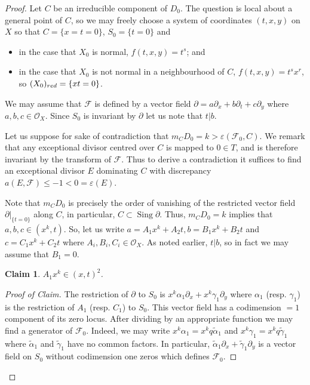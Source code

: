 \documentclass[10pt,a4paper]{amsart}
\newtheorem{claim}[theorem]{Claim}
\DeclareMathOperator{\sing}{Sing}
\begin{document}
\begin{proof}
	Let $C$ be an irreducible component of $D_0$.  The question is local about a general point of  $C$, so we may freely choose a system of coordinates $(t, x, y)$ on $X$ so that
	 $C = \{x = t = 0\}$, $S_0 = \{t = 0\}$ and 
     \begin{itemize}
         \item in the case that $X_0$ is normal, $f(t, x, y) = t^s$; and 
         \item  in the case that $X_0$ is not normal in a neighbourhood of $C$, $f(t, x, y) = t^sx^r$, so $(X_0)_{{\rm red}} = \{xt = 0\}$.
     \end{itemize}
 
	We may assume that $\mathcal F$ is defined by a vector field  $\partial = a\partial_x+b\partial_t+c\partial_y$
    where $a, b, c \in \mathcal O_X$.  Since $S_0$ is invariant by $\partial$ let us note that $t|b$.



Let us suppose for sake of contradiction that $m_CD_0 = k >\varepsilon(\mathcal F_0, C)$.
We remark that any exceptional divisor centred over $C$ is mapped to $0 \in T$, and is therefore invariant by the transform of $\mathcal F$.  Thus to derive a contradiction it suffices to find an exceptional divisor $E$ dominating $C$ with discrepancy $a(E, \mathcal F) \leq -1 < 0 = \varepsilon(E)$.




Note that $m_CD_0$ is precisely the order of vanishing of the restricted vector field $\partial|_{\{t = 0\}}$ along $C$, in particular, $C \subset \sing \partial$.  Thus,
$m_CD_0 = k$
implies that $a, b, c \in (x^k, t)$.
So, let us write $a = A_1x^k+A_2t, b = B_1x^k+B_2t$
and $c = C_1x^k+C_2t$ where $A_i, B_i, C_i \in \mathcal O_X$.
As noted earlier, $t|b$, so in fact we may assume that $B_1 = 0$.


\begin{claim}
\label{claim_order2}
$A_1x^k \in (x, t)^2$.
\end{claim}
\begin{proof}[Proof of Claim]
The restriction of $\partial$ to $S_0$ is 
$x^k\alpha_1\partial_x+x^k\gamma_1\partial_y$ where $\alpha_1$ (resp. $\gamma_1$) is the restriction of $A_1$ (resp. $C_1$) to $S_0$. This vector field has a codimension $=1$ component of its zero locus.  After dividing by an appropriate function we may find a generator of $\mathcal F_0$.  Indeed, we may write $x^k\alpha_1 = x^kq\tilde{\alpha}_1$ and 
$x^k\gamma_1 = x^kq\tilde{\gamma}_1$
where $\tilde{\alpha}_1$ and $\tilde{\gamma}_1$ have no common factors.  In particular, $\tilde{\alpha}_1\partial_x+\tilde{\gamma}_1\partial_y$
is a vector field on $S_0$ without codimension one zeros which defines $\mathcal F_0$.


\end{proof}
\end{proof}
\end{document}
